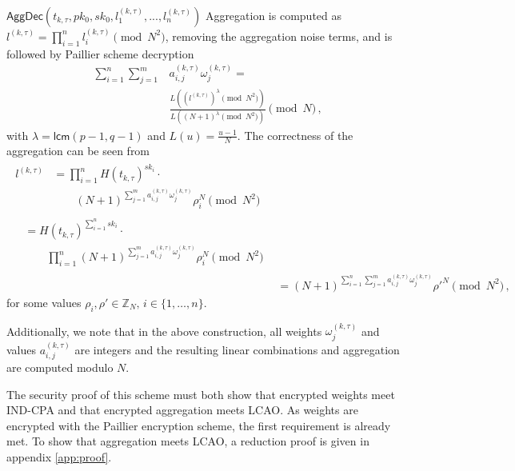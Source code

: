 \documentclass[10pt,letterpaper,oneside,twocolumn,journal]{IEEEtran}
\theoremstyle{definition}
\theoremstyle{definition}
\theoremstyle{remark}
\newcommand\shrtdots{\!...}
\begin{document}
\begin{LaTeXdescription}
    \item[$\mathsf{AggDec}(t_{k,\tau}, pk_0, sk_0, l^{(k,\tau)}_1,\shrtdots,l^{(k,\tau)}_n)$] Aggregation is computed as $l^{(k,\tau)} = \prod^n_{i=1}l^{(k,\tau)}_i \pmod{N^2}$, removing the aggregation noise terms, and is followed by Paillier scheme decryption
    \begin{equation}
        \begin{split}
            \sum^{n}_{i=1}\sum^{m}_{j=1}&a^{(k,\tau)}_{i,j}\omega^{(k,\tau)}_j =\\
            &\frac{L((l^{(k,\tau)})^\lambda\pmod{N^2})}{L((N+1)^\lambda\pmod{N^2})} \pmod{N}\,,
        \end{split} \label{eqn:our_scheme_decrypt}
    \end{equation}
    with $\lambda = \mathsf{lcm}(p-1, q-1)$ and $L(u) = \frac{u-1}{N}$. The correctness of the aggregation can be seen from
    \begin{align*}
        \begin{split}
        l^{(k,\tau)} &= \prod^n_{i=1}H(t_{k,\tau})^{sk_i}\cdot \\
        &\qquad (N+1)^{\sum^{m}_{j=1}a^{(k,\tau)}_{i,j}\omega^{(k,\tau)}_j}\rho_i^N \pmod{N^2}
        \end{split}\\
        \begin{split}
            &= H(t_{k,\tau})^{\sum^n_{i=1}sk_i}\cdot \\
            &\qquad \prod^n_{i=1}(N+1)^{\sum^{m}_{j=1}a^{(k,\tau)}_{i,j}\omega^{(k,\tau)}_j}\rho_i^N \pmod{N^2}
        \end{split}\\
        &= (N+1)^{\sum^n_{i=1}\sum^{m}_{j=1}a^{(k,\tau)}_{i,j}\omega^{(k,\tau)}_j}\rho'^N \pmod{N^2}\,,
    \end{align*}
    for some values $\rho_i,\rho' \in \mathbb{Z}_N,\,i\in\{1,\dots,n\}$.
\end{LaTeXdescription}
Additionally, we note that in the above construction, all weights $\omega^{(k,\tau)}_j$ and values $a^{(k,\tau)}_{i,j}$ are integers and the resulting linear combinations and aggregation are computed modulo $N$. 

The security proof of this scheme must both show that encrypted weights meet IND-CPA and that encrypted aggregation meets LCAO. As weights are encrypted with the Paillier encryption scheme, the first requirement is already met. To show that aggregation meets LCAO, a reduction proof is given in appendix \ref{app:proof}.
\end{document}
